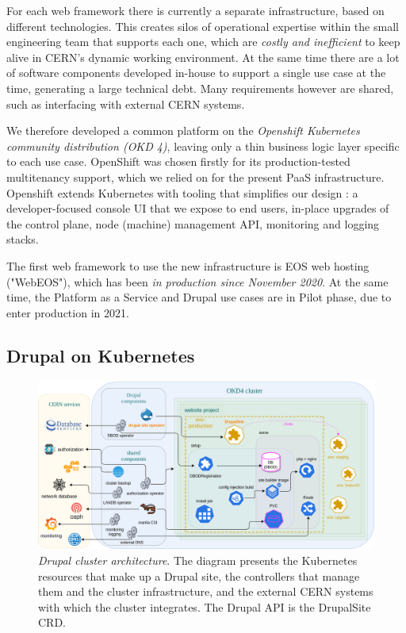 For each web framework there is currently a separate infrastructure, based on different technologies.
This creates silos of operational expertise within the small engineering team that supports each one, which are \emph{costly and inefficient} to keep alive in CERN's dynamic working environment.
At the same time there are a lot of software components developed in-house to support a single use case at the time, generating a large technical debt.
Many requirements however are shared, such as interfacing with external CERN systems.

We therefore developed a common platform on the \emph{Openshift Kubernetes community distribution (OKD 4)},
leaving only a thin business logic layer specific to each use case.
OpenShift was chosen firstly for its production-tested multitenancy support, which we relied on for the present PaaS infrastructure.
Openshift extends Kubernetes with tooling that simplifies our design \cite{jarvinen_extending_2019}:
a developer-focused console UI that we expose to end users, in-place upgrades of the control plane, node (machine) management API, monitoring and logging stacks.

The first web framework to use the new infrastructure is EOS web hosting ("WebEOS"), which has been \emph{in production since November 2020}.
At the same time, the Platform as a Service and Drupal use cases are in Pilot phase, due to enter production in 2021.

\subsection{Drupal on Kubernetes}

\begin{figure}[t]
    \centering
    \includegraphics[width=1.05\textwidth]{figures/drupal-components}
    \caption{\emph{Drupal cluster architecture}.
    The diagram presents the Kubernetes resources that {\color{darkseagreen} make up a Drupal site},
    the {\color{carolinablue} controllers} that manage them and the cluster infrastructure,
    and the {\color{beige} external CERN systems} with which the cluster integrates.
    The Drupal API is the {\color{fluorescentorange} DrupalSite CRD}.}
    \label{fig:drupal-components}
\end{figure}

